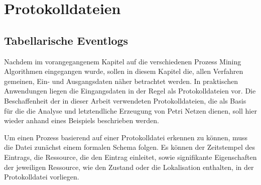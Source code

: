
\section{Protokolldateien}
\subsection{Tabellarische Eventlogs}
Nachdem im vorangegangenem Kapitel auf die verschiedenen Prozess Mining Algorithmen eingegangen wurde, sollen in diesem Kapitel die, allen Verfahren gemeinen, Ein- und Ausgangsdaten näher betrachtet werden.
In praktischen Anwendungen liegen die Eingangsdaten in der Regel als Protokolldateien vor. Die Beschaffenheit der in dieser Arbeit verwendeten  Protokolldateien, die als Basis für die die Analyse und letztendliche Erzeugung von Petri Netzen dienen, soll hier wieder anhand eines Beispiels beschrieben werden.

Um einen Prozess basierend auf einer Protokolldatei erkennen zu können, muss die Datei zunächst einem formalen Schema folgen. Es können der Zeitstempel des Eintrags, die Ressource, die den Eintrag einleitet, sowie signifikante Eigenschaften der jeweiligen Ressource, wie den Zustand oder die Lokalisation enthalten, in der Protokolldatei vorliegen.

